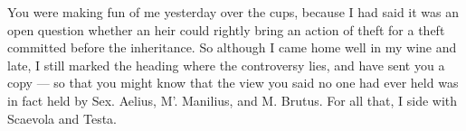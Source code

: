 

 You were making fun of me yesterday over the cups, because I had said it was an open question whether an heir could rightly bring an action of theft for a theft committed before the inheritance. So although I came home well in my wine and late, I still marked the heading where the controversy lies, and have sent you a copy --- so that you might know that the view you said no one had ever held was in fact held by Sex. Aelius, M'. Manilius, and M. Brutus. For all that, I side with Scaevola and Testa.
